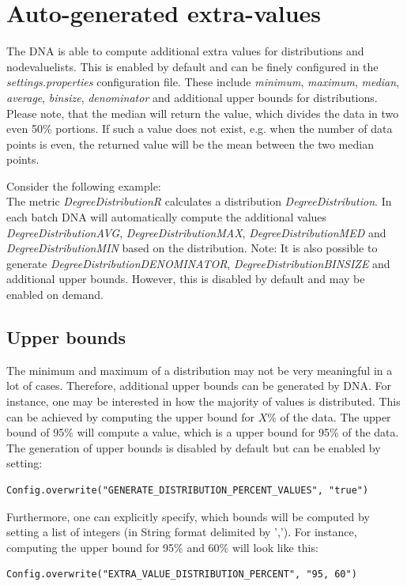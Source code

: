 \section{Auto-generated extra-values}
The DNA is able to compute additional extra values for distributions and nodevaluelists. This is enabled by default and can be finely configured in the \textit{settings.properties} configuration file. These include \textit{minimum}, \textit{maximum}, \textit{median}, \textit{average}, \textit{binsize}, \textit{denominator} and additional upper bounds for distributions. Please note, that the median will return the value, which divides the data in two even 50\% portions. If such a value does not exist, e.g. when the number of data points is even, the returned value will be the mean between the two median points. 

Consider the following example:\\
The metric \textit{DegreeDistributionR} calculates a distribution \textit{DegreeDistribution}. In each batch DNA will automatically compute the additional values \textit{DegreeDistribution\textunderscore AVG}, \textit{DegreeDistribution\textunderscore MAX}, \textit{DegreeDistribution\textunderscore MED} and \textit{DegreeDistribution\textunderscore MIN} based on the distribution. Note: It is also possible to generate \textit{DegreeDistribution\textunderscore DENOMINATOR}, \textit{DegreeDistribution\textunderscore BINSIZE} and additional upper bounds. However, this is disabled by default and may be enabled on demand.

\subsection{Upper bounds}
The minimum and maximum of a distribution may not be very meaningful in a lot of cases.  Therefore, additional upper bounds can be generated by DNA. For instance, one may be interested in how the majority of values is distributed. This can be achieved by computing the upper bound for $X$\% of the data. The upper bound of 95\% will compute a value, which is a upper bound for 95\% of the data. The generation of upper bounds is disabled by default but can be enabled by setting:
\begin{lstlisting}
Config.overwrite("GENERATE_DISTRIBUTION_PERCENT_VALUES", "true")
\end{lstlisting}
Furthermore, one can explicitly specify, which bounds will be computed by setting a list of integers (in String format delimited by ','). For instance, computing the upper bound for 95\% and 60\% will look like this:
\begin{lstlisting}
Config.overwrite("EXTRA_VALUE_DISTRIBUTION_PERCENT", "95, 60")
\end{lstlisting}



 